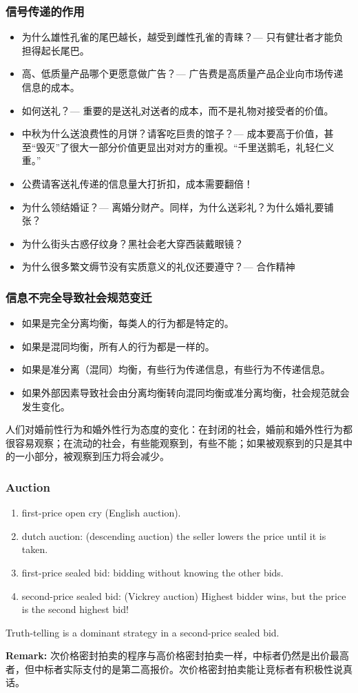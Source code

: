 \documentclass[UTF8,11pt,colorlinks,compress,openany]{beamer}%
\begin{document}
\begin{frame}\frametitle{信号传递的作用}
\begin{itemize}
	\item 为什么雄性孔雀的尾巴越长，越受到雌性孔雀的青睐？--- 只有健壮者才能负担得起长尾巴。
	\item 高、低质量产品哪个更愿意做广告？--- 广告费是高质量产品企业向市场传递信息的成本。
	\item 如何送礼？--- 重要的是送礼对送者的成本，而不是礼物对接受者的价值。
	\item 中秋为什么送浪费性的月饼？请客吃巨贵的馆子？--- 成本要高于价值，甚至“毁灭”了很大一部分价值更显出对对方的重视。“千里送鹅毛，礼轻仁义重。” 
	\item 公费请客送礼传递的信息量大打折扣，成本需要翻倍！
	\item 为什么领结婚证？--- 离婚分财产。同样，为什么送彩礼？为什么婚礼要铺张？
	\item 为什么街头古惑仔纹身？黑社会老大穿西装戴眼镜？
	\item 为什么很多繁文缛节没有实质意义的礼仪还要遵守？--- 合作精神
\end{itemize}
\end{frame}

\begin{frame}\frametitle{信息不完全导致社会规范变迁}
\begin{itemize}
	\item 如果是完全分离均衡，每类人的行为都是特定的。
	\item 如果是混同均衡，所有人的行为都是一样的。
	\item 如果是准分离（混同）均衡，有些行为传递信息，有些行为不传递信息。
	\item 如果外部因素导致社会由分离均衡转向混同均衡或准分离均衡，社会规范就会发生变化。
\end{itemize}
\begin{block}{}
人们对婚前性行为和婚外性行为态度的变化：在封闭的社会，婚前和婚外性行为都很容易观察；在流动的社会，有些能观察到，有些不能；如果被观察到的只是其中的一小部分，被观察到压力将会减少。
\end{block}
\end{frame}

\begin{frame}\frametitle{Auction}
\begin{enumerate}
	\item first-price open cry (English auction).
	\item dutch auction: (descending auction) the seller lowers the price until it is taken.
	\item first-price sealed bid: bidding without knowing the other bids.
	\item second-price sealed bid: (Vickrey auction) Highest bidder wins, but the price is the second highest bid!
\end{enumerate}
\begin{theorem}
Truth-telling is a dominant strategy in a second-price sealed bid.
\end{theorem}
\textbf{Remark:} 次价格密封拍卖的程序与高价格密封拍卖一样，中标者仍然是出价最高者，但中标者实际支付的是第二高报价。次价格密封拍卖能让竞标者有积极性说真话。
\end{frame}
\end{document}
